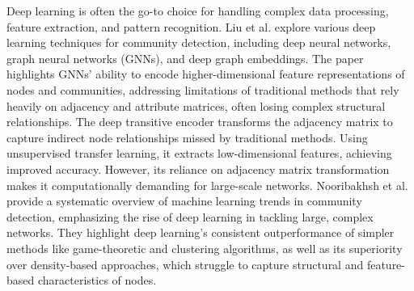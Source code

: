 \documentclass{article}
\begin{document}
Deep learning is often the go-to choice for handling complex data processing, feature extraction, and pattern recognition. Liu et al.\cite{10.5555/3491440.3492133} explore various deep learning techniques for community detection, including deep neural networks, graph neural networks (GNNs), and deep graph embeddings. The paper highlights GNNs’ ability to encode higher-dimensional feature representations of nodes and communities, addressing limitations of traditional methods that rely heavily on adjacency and attribute matrices, often losing complex structural relationships. The deep transitive encoder\cite{XIE201975} transforms the adjacency matrix to capture indirect node relationships missed by traditional methods. Using unsupervised transfer learning, it extracts low-dimensional features, achieving improved accuracy. However, its reliance on adjacency matrix transformation makes it computationally demanding for large-scale networks. Nooribakhsh et al.~\cite{Nooribakhsh2024} provide a systematic overview of machine learning trends in community detection, emphasizing the rise of deep learning in tackling large, complex networks. They highlight deep learning’s consistent outperformance of simpler methods like game-theoretic and clustering algorithms, as well as its superiority over density-based approaches, which struggle to capture structural and feature-based characteristics of nodes.
\end{document}
